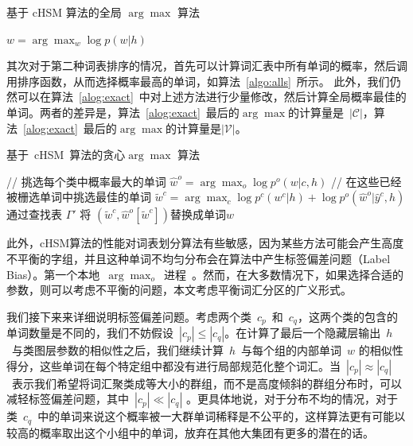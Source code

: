 \begin{algorithm}[!ht]
\caption{基于 cHSM 算法的全局 $\arg\max$ 算法}\label{algo:alls}
 {$w=\arg\max_w \log p(w|h)$}\;
\end{algorithm}

其次对于第二种词表排序的情况，首先可以计算词汇表中所有单词的概率，然后调用排序函数，从而选择概率最高的单词，如算法~\ref{algo:alls}~所示。 此外，我们仍然可以在算法~\ref{alog:exact}~中对上述方法进行少量修改，然后计算全局概率最佳的单词。两者的差异是，算法~\ref{alog:exact}~最后的$\arg\max$的计算量是~$\mathcal{|C|}$，算法~\ref{alog:exact}~最后的$\arg\max$的计算量是$\mathcal{|V|}$。
\begin{algorithm}[!t]
\caption{基于~cHSM~算法的贪心$\arg\max$ 算法}\label{alog:exact}
{// 挑选每个类中概率最大的单词}\;
 {$\hat w^o=\arg\max_o{\log p^o(w| c,h)}$ }\;
 {// 在这些已经被栅选单词中挑选最佳的单词}
 {$\tilde w^c=\arg\max_c{\log p^c(w^c|h)+\log p^o(\hat w^o|\hat y^c,h)}$}\;
通过查找表 $\Gamma'$ 将 $(\tilde w^c,\hat w^o[\tilde w^c])$替换成单词$w$ \;
\end{algorithm}


此外，cHSM算法的性能对词表划分算法有些敏感，因为某些方法可能会产生高度不平衡的字组，并且这种单词不均匀分布会在算法中产生标签偏差问题（Label Bias）。第一个本地~$\arg\max_o$~进程~。然而，在大多数情况下，如果选择合适的参数，则可以考虑不平衡的问题，本文考虑平衡词汇分区的广义形式。

我们接下来来详细说明标签偏差问题。考虑两个类~$c_p$~和~$c_q$，这两个类的包含的单词数量是不同的，我们不妨假设~$|c_p|\le|c_q|$。在计算了最后一个隐藏层输出~$h$~与类图层参数的相似性之后，我们继续计算~$h$~与每个组的内部单词~$w$ 的相似性得分，这些单词在每个特定组中都没有进行局部规范化整个词汇。当~$|c_p|\approx|c_q|$~表示我们希望将词汇聚类成等大小的群组，而不是高度倾斜的群组分布时，可以减轻标签偏差问题，其中~$|c_p|\ll|c_q|$ 。更具体地说，对于分布不均的情况，对于类~$c_q$~中的单词来说这个概率被一大群单词稀释是不公平的，这样算法更有可能以较高的概率取出这个小组中的单词，放弃在其他大集团有更多的潜在的话。

